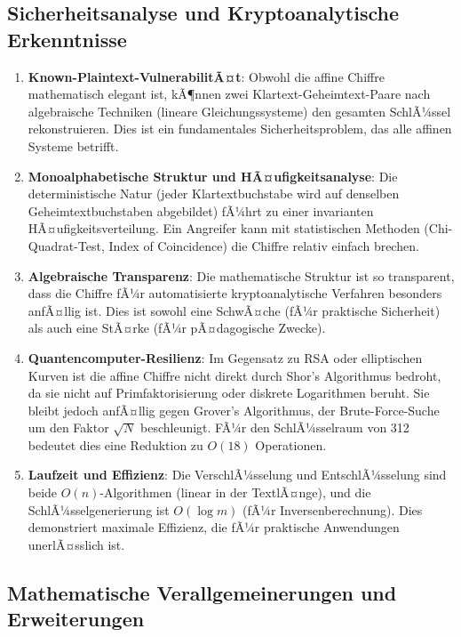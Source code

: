 ﻿\documentclass[12pt,a4paper]{article}
\begin{document}
	\subsection{Sicherheitsanalyse und Kryptoanalytische Erkenntnisse}
	
	\begin{enumerate}
		\item \textbf{Known-Plaintext-VulnerabilitÃ¤t}: Obwohl die affine Chiffre mathematisch elegant ist, kÃ¶nnen zwei Klartext-Geheimtext-Paare nach algebraische Techniken (lineare Gleichungssysteme) den gesamten SchlÃ¼ssel rekonstruieren. Dies ist ein fundamentales Sicherheitsproblem, das alle affinen Systeme betrifft.
		
		\item \textbf{Monoalphabetische Struktur und HÃ¤ufigkeitsanalyse}: Die deterministische Natur (jeder Klartextbuchstabe wird auf denselben Geheimtextbuchstaben abgebildet) fÃ¼hrt zu einer invarianten HÃ¤ufigkeitsverteilung. Ein Angreifer kann mit statistischen Methoden (Chi-Quadrat-Test, Index of Coincidence) die Chiffre relativ einfach brechen.
		
		\item \textbf{Algebraische Transparenz}: Die mathematische Struktur ist so transparent, dass die Chiffre fÃ¼r automatisierte kryptoanalytische Verfahren besonders anfÃ¤llig ist. Dies ist sowohl eine SchwÃ¤che (fÃ¼r praktische Sicherheit) als auch eine StÃ¤rke (fÃ¼r pÃ¤dagogische Zwecke).
		
		\item \textbf{Quantencomputer-Resilienz}: Im Gegensatz zu RSA oder elliptischen Kurven ist die affine Chiffre nicht direkt durch Shor's Algorithmus bedroht, da sie nicht auf Primfaktorisierung oder diskrete Logarithmen beruht. Sie bleibt jedoch anfÃ¤llig gegen Grover's Algorithmus, der Brute-Force-Suche um den Faktor $\sqrt{N}$ beschleunigt. FÃ¼r den SchlÃ¼sselraum von 312 bedeutet dies eine Reduktion zu $O(18)$ Operationen.
		
		\item \textbf{Laufzeit und Effizienz}: Die VerschlÃ¼sselung und EntschlÃ¼sselung sind beide $O(n)$-Algorithmen (linear in der TextlÃ¤nge), und die SchlÃ¼sselgenerierung ist $O(\log m)$ (fÃ¼r Inversenberechnung). Dies demonstriert maximale Effizienz, die fÃ¼r praktische Anwendungen unerlÃ¤sslich ist.
	\end{enumerate}
	
	\subsection{Mathematische Verallgemeinerungen und Erweiterungen}
	
\end{document}
